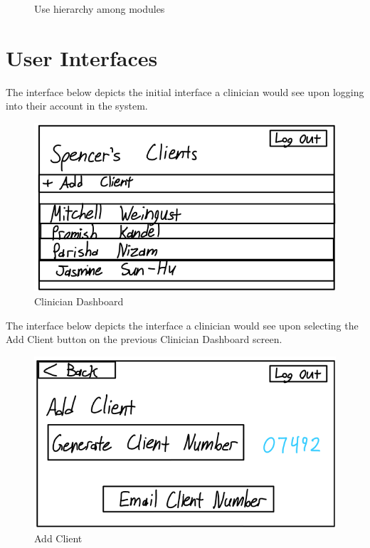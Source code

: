 \documentclass[12pt, titlepage]{article}
\begin{document}

\begin{figure}[H]
\centering
\caption{Use hierarchy among modules}
\label{FigUH}
\end{figure}


\section{User Interfaces}


\hspace{1.5em}The interface below depicts the initial interface a clinician would see upon logging into their account in the system.
\begin{figure}[H]
  \centering
  \includegraphics[scale=0.9]{images/Clinician-Dashboard.png}
  \caption{Clinician Dashboard}
\end{figure}

\hspace{1.5em}The interface below depicts the interface a clinician would see upon selecting the Add Client button on the previous Clinician Dashboard screen.
\begin{figure}[H]
  \centering
  \includegraphics[scale=0.9]{images/Add-Client.png}
  \caption{Add Client}
\end{figure}
\end{document}
